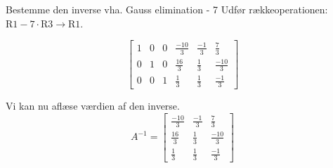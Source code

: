 \documentclass{article}
\begin{document}
\begin{exercise}{Bestemme den inverse vha. Gauss elimination - 7}
\hint
Udfør rækkeoperationen: $\text{R1} - 7 \cdot \text{R3} \to \text{R1}$.

\hint
\[
\left[\begin{array}{ccc|ccc}
1 & 0 & 0 & \frac{-10}{3} & \frac{-1}{3} & \frac{7}{3} \\
0 & 1 & 0 & \frac{16}{3} & \frac{1}{3} & \frac{-10}{3} \\
0 & 0 & 1 & \frac{1}{3} & \frac{1}{3} & \frac{-1}{3}
\end{array} \right]
\]

\hint
Vi kan nu aflæse værdien af den inverse.
\[
A^{-1} = \left[\begin{array}{ccc}
\frac{-10}{3} & \frac{-1}{3} & \frac{7}{3} \\
\frac{16}{3} & \frac{1}{3} & \frac{-10}{3} \\
\frac{1}{3} & \frac{1}{3} & \frac{-1}{3}
\end{array} \right]
\]


\end{exercise}
\end{document}
